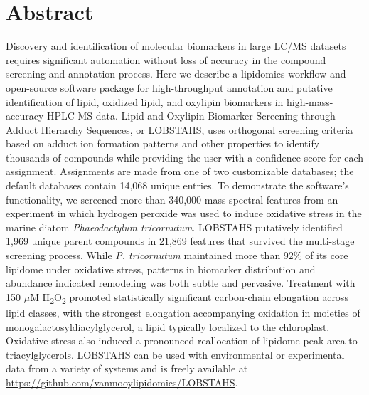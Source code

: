\section{Abstract}
Discovery and identification of molecular biomarkers in large LC/MS datasets requires significant automation without loss of accuracy in the compound screening and annotation process. Here we describe a lipidomics workflow and open-source software package for high-throughput annotation and putative identification of lipid, oxidized lipid, and oxylipin biomarkers in high-mass-accuracy HPLC-MS data. Lipid and Oxylipin Biomarker Screening through Adduct Hierarchy Sequences, or LOBSTAHS, uses orthogonal screening criteria based on adduct ion formation patterns and other properties to identify thousands of compounds while providing the user with a confidence score for each assignment. Assignments are made from one of two customizable databases; the default databases contain 14,068 unique entries. To demonstrate the software's functionality, we screened more than 340,000 mass spectral features from an experiment in which hydrogen peroxide was used to induce oxidative stress in the marine diatom \emph{Phaeodactylum tricornutum}. LOBSTAHS putatively identified 1,969 unique parent compounds in 21,869 features that survived the multi-stage screening process. While \emph{P. tricornutum} maintained more than 92\% of its core lipidome under oxidative stress, patterns in biomarker distribution and abundance indicated remodeling was both subtle and pervasive. Treatment with 150 $\mu$M H\textsubscript{2}O\textsubscript{2} promoted statistically significant carbon-chain elongation across lipid classes, with the strongest elongation accompanying oxidation in moieties of monogalactosyldiacylglycerol, a lipid typically localized to the chloroplast. Oxidative stress also induced a pronounced reallocation of lipidome peak area to triacylglycerols. LOBSTAHS can be used with environmental or experimental data from a variety of systems and is freely available at \url{https://github.com/vanmooylipidomics/LOBSTAHS}.
\clearpage
